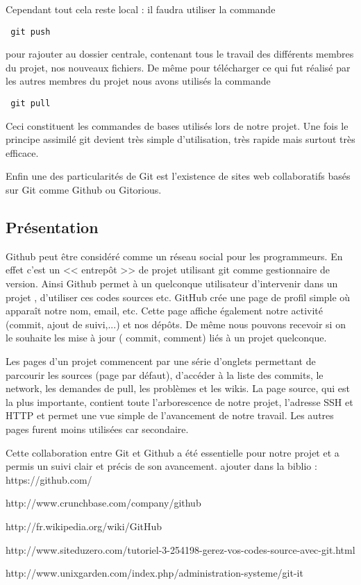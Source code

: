 Cependant tout cela reste local : il faudra utiliser la commande
\begin{verbatim} git push \end{verbatim}
pour rajouter au dossier centrale, contenant tous le travail des diff\'erents membres du projet, nos nouveaux fichiers. 
De m\^eme pour t\'el\'echarger ce qui fut r\'ealis\'e par les autres membres 
du projet nous avons utilis\'es la commande
\begin{verbatim} git pull \end{verbatim}

Ceci constituent les commandes de bases utilis\'es lors de notre projet. Une fois le principe assimil\'e git devient tr\`es simple d'utilisation,
 tr\`es rapide mais surtout tr\`es efficace.

Enfin une des particularit\'es de Git est l'existence de sites web collaboratifs bas\'es sur Git comme  Github ou Gitorious. 

\subsection{Pr\'esentation}

Github peut \^etre consid\'er\'e comme un r\'eseau social pour les programmeurs. En effet c'est un << entrep\^ot >> de projet utilisant git comme 
gestionnaire de version. Ainsi Github permet \`a un quelconque utilisateur d'intervenir dans un projet , d'utiliser ces codes sources etc.
GitHub cr\'ee une page de profil simple o\`u appara\^it notre nom, email, etc. Cette page affiche \'egalement notre activit\'e (commit, ajout de suivi,...)
 et nos d\'ep\^ots. De m\^eme nous pouvons recevoir si on le souhaite les mise \`a  jour ( commit, comment) li\'es \`a un projet quelconque.

Les pages d'un projet commencent par une s\'erie d'onglets permettant de parcourir les sources (page par d\'efaut), d'acc\'eder \`a la liste des
 commits, le network, les demandes de pull, les probl\`emes et les wikis.
La page source, qui est la plus importante, contient toute l'arborescence de notre projet, l'adresse SSH et HTTP et permet une vue simple
 de l'avancement de notre travail.
Les autres pages furent moins utilis\'ees car secondaire. 

Cette collaboration entre Git et Github a \'et\'e essentielle pour notre projet et a permis un suivi clair et pr\'ecis de son avancement.
\newline
\newline
\newline
\newline
ajouter dans la biblio :
\newline
https://github.com/

http://www.crunchbase.com/company/github

http://fr.wikipedia.org/wiki/GitHub

http://www.siteduzero.com/tutoriel-3-254198-gerez-vos-codes-source-avec-git.html

http://www.unixgarden.com/index.php/administration-systeme/git-it